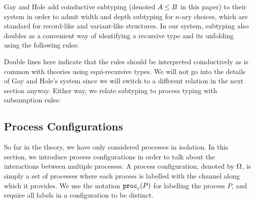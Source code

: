 \documentclass[submission,copyright,creativecommons]{eptcs}
\newcommand{\m}[1]{\mathsf{#1}}
\begin{document}
Gay and Hole \cite{GayH05} add coinductive subtyping (denoted $A \le B$ in this paper) to their system in order to admit width and depth subtyping for $n$-ary choices, which are standard for record-like and variant-like structures. In our system, subtyping also doubles as a convenient way of identifying a recursive type and its unfolding using the following rules:
Double lines here indicate that the rules should be interpreted coinductively as is common with theories using equi-recursive types. We will not go into the details of Gay and Hole's system since we will switch to a different relation in the next section anyway. Either way, we relate subtyping to process typing with subsumption rules:


\subsection{Process Configurations}

So far in the theory, we have only considered processes in isolation. In this section, we introduce process configurations in order to talk about the interactions between multiple processes. A process configuration, denoted by $\Omega$, is simply a set of processes where each process is labelled with the channel along which it provides. We use the notation $\mathtt{proc}_{c}(P)$ for labelling the process $P$, and require all labels in a configuration to be distinct.
\end{document}
